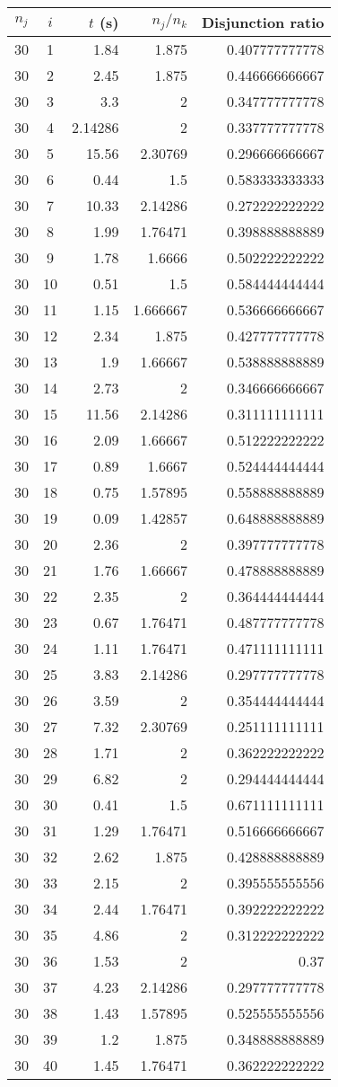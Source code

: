 \documentclass[13pt, letterpaper, oneside]{book}
\begin{document}
\begin{tabular}{c c r r r}
\toprule
$n_j$ & $i$ & $t$ (s) & $n_j/n_k$ & Disjunction ratio \\
\midrule
30&1&1.84&1.875&0.407777777778\\
30&2&2.45&1.875&0.446666666667\\
30&3&3.3&2&0.347777777778\\
30&4&2.14286&2&0.337777777778\\
30&5&15.56&2.30769&0.296666666667\\
30&6&0.44&1.5&0.583333333333\\
30&7&10.33&2.14286&0.272222222222\\
30&8&1.99&1.76471&0.398888888889\\
30&9&1.78&1.6666&0.502222222222\\
30&10&0.51&1.5&0.584444444444\\
30&11&1.15&1.666667&0.536666666667\\
30&12&2.34&1.875&0.427777777778\\
30&13&1.9&1.66667&0.538888888889\\
30&14&2.73&2&0.346666666667\\
30&15&11.56&2.14286&0.311111111111\\
30&16&2.09&1.66667&0.512222222222\\
30&17&0.89&1.6667&0.524444444444\\
30&18&0.75&1.57895&0.558888888889\\
30&19&0.09&1.42857&0.648888888889\\
30&20&2.36&2&0.397777777778\\
30&21&1.76&1.66667&0.478888888889\\
30&22&2.35&2&0.364444444444\\
30&23&0.67&1.76471&0.487777777778\\
30&24&1.11&1.76471&0.471111111111\\
30&25&3.83&2.14286&0.297777777778\\
30&26&3.59&2&0.354444444444\\
30&27&7.32&2.30769&0.251111111111\\
30&28&1.71&2&0.362222222222\\
30&29&6.82&2&0.294444444444\\
30&30&0.41&1.5&0.671111111111\\
30&31&1.29&1.76471&0.516666666667\\
30&32&2.62&1.875&0.428888888889\\
30&33&2.15&2&0.395555555556\\
30&34&2.44&1.76471&0.392222222222\\
30&35&4.86&2&0.312222222222\\
30&36&1.53&2&0.37\\
30&37&4.23&2.14286&0.297777777778\\
30&38&1.43&1.57895&0.525555555556\\
30&39&1.2&1.875&0.348888888889\\
30&40&1.45&1.76471&0.362222222222\\
\bottomrule
\end{tabular}
\pagebreak
\end{document}
